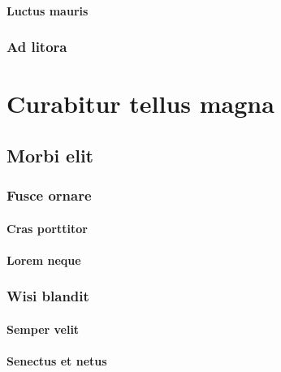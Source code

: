 \subsubsection{Luctus mauris} \lipsum[20]
\subsection{Ad litora} \lipsum [21-22]



\chapter{Curabitur tellus magna}


 \lipsum[1-2]

\section{Morbi elit} \lipsum[3-4]

\hbWideBottomArtFirstPageFix %

\subsection{Fusce ornare} \lipsum[5]

\subsubsection{Cras porttitor} \lipsum[6]
\subsubsection{Lorem neque} \lipsum[7]
\subsection{Wisi blandit} \lipsum[8]
\subsubsection{Semper velit} \lipsum[9]

\subsubsection{Senectus et netus} \lipsum[10]
